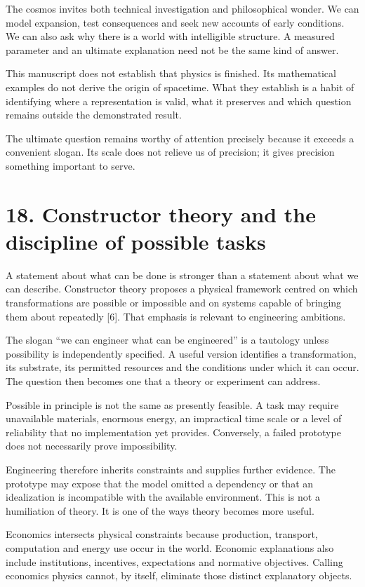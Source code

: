 \documentclass[10pt]{article}
\begin{document}
The cosmos invites both technical investigation and philosophical wonder. We can model expansion, test consequences and seek new accounts of early conditions. We can also ask why there is a world with intelligible structure. A measured parameter and an ultimate explanation need not be the same kind of answer.

This manuscript does not establish that physics is finished. Its mathematical examples do not derive the origin of spacetime. What they establish is a habit of identifying where a representation is valid, what it preserves and which question remains outside the demonstrated result.

The ultimate question remains worthy of attention precisely because it exceeds a convenient slogan. Its scale does not relieve us of precision; it gives precision something important to serve.

\clearpage
\section*{18. Constructor theory and the discipline of possible tasks}
A statement about what can be done is stronger than a statement about what we can describe. Constructor theory proposes a physical framework centred on which transformations are possible or impossible and on systems capable of bringing them about repeatedly [6]. That emphasis is relevant to engineering ambitions.

The slogan ``we can engineer what can be engineered'' is a tautology unless possibility is independently specified. A useful version identifies a transformation, its substrate, its permitted resources and the conditions under which it can occur. The question then becomes one that a theory or experiment can address.

Possible in principle is not the same as presently feasible. A task may require unavailable materials, enormous energy, an impractical time scale or a level of reliability that no implementation yet provides. Conversely, a failed prototype does not necessarily prove impossibility.

Engineering therefore inherits constraints and supplies further evidence. The prototype may expose that the model omitted a dependency or that an idealization is incompatible with the available environment. This is not a humiliation of theory. It is one of the ways theory becomes more useful.

Economics intersects physical constraints because production, transport, computation and energy use occur in the world. Economic explanations also include institutions, incentives, expectations and normative objectives. Calling economics physics cannot, by itself, eliminate those distinct explanatory objects.
\end{document}
